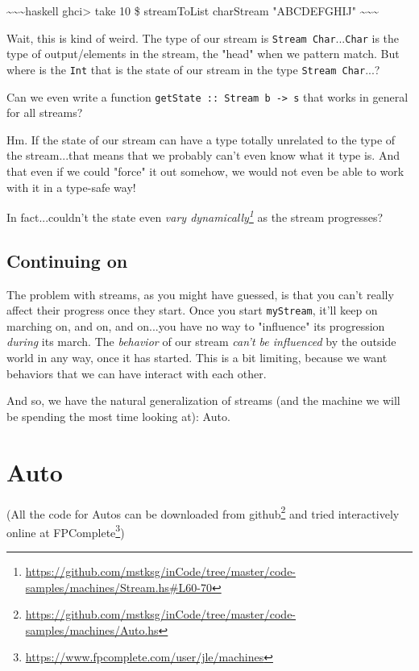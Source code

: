 \documentclass[]{article}
\renewcommand{\href}[2]{#2\footnote{\url{#1}}}
\begin{document}
\textasciitilde{}\textasciitilde{}\textasciitilde{}haskell ghci\textgreater{}
take 10 \$ streamToList charStream "ABCDEFGHIJ"
\textasciitilde{}\textasciitilde{}\textasciitilde{}

Wait, this is kind of weird. The type of our stream is
\texttt{Stream\ Char}...\texttt{Char} is the type of output/elements in the
stream, the "head" when we pattern match. But where is the \texttt{Int} that is
the state of our stream in the type \texttt{Stream\ Char}...?

Can we even write a function
\texttt{getState\ ::\ Stream\ b\ -\textgreater{}\ s} that works in general for
all streams?

Hm. If the state of our stream can have a type totally unrelated to the type of
the stream...that means that we probably can't even know what it type is. And
that even if we could "force" it out somehow, we would not even be able to work
with it in a type-safe way!

In fact...couldn't the state even
\emph{\href{https://github.com/mstksg/inCode/tree/master/code-samples/machines/Stream.hs\#L60-70}{vary
dynamically}} as the stream progresses?

\subsection{Continuing on}

The problem with streams, as you might have guessed, is that you can't really
affect their progress once they start. Once you start \texttt{myStream}, it'll
keep on marching on, and on, and on...you have no way to "influence" its
progression \emph{during} its march. The \emph{behavior} of our stream
\emph{can't be influenced} by the outside world in any way, once it has started.
This is a bit limiting, because we want behaviors that we can have interact with
each other.

And so, we have the natural generalization of streams (and the machine we will
be spending the most time looking at): Auto.

\section{Auto}

(All the code for Autos can be downloaded
\href{https://github.com/mstksg/inCode/tree/master/code-samples/machines/Auto.hs}{from
github} and tried interactively online
\href{https://www.fpcomplete.com/user/jle/machines}{at FPComplete})
\end{document}
